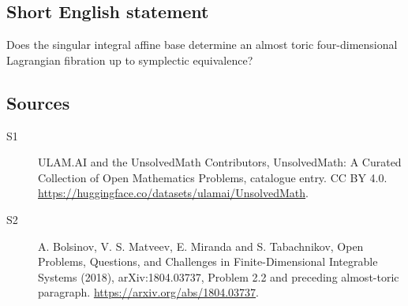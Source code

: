 \documentclass[11pt]{article}
\begin{document}
\subsection{Short English statement}
Does the singular integral affine base determine an almost toric four-dimensional Lagrangian fibration up to symplectic equivalence?
\subsection{Sources}
\begin{description}
\item[\hypertarget{source:statement:1}{S1}] ULAM.AI and the UnsolvedMath Contributors, UnsolvedMath: A Curated Collection of Open Mathematics Problems, catalogue entry. CC BY 4.0. \url{https://huggingface.co/datasets/ulamai/UnsolvedMath}.
\item[\hypertarget{source:statement:2}{S2}] A. Bolsinov, V. S. Matveev, E. Miranda and S. Tabachnikov, Open Problems, Questions, and Challenges in Finite-Dimensional Integrable Systems (2018), arXiv:1804.03737, Problem 2.2 and preceding almost-toric paragraph. \url{https://arxiv.org/abs/1804.03737}.
\end{description}
\label{end:statement}
\end{document}
